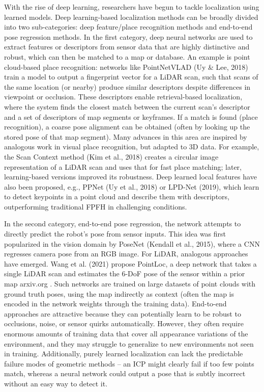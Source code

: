 With the rise of deep learning, researchers have begun to tackle localization using learned models. Deep learning-based localization methods can be broadly divided into two sub-categories: deep feature/place recognition methods and end-to-end pose regression methods. In the first category, deep neural networks are used to extract features or descriptors from sensor data that are highly distinctive and robust, which can then be matched to a map or database. An example is point cloud-based place recognition: networks like PointNetVLAD (Uy & Lee, 2018) train a model to output a fingerprint vector for a LiDAR scan, such that scans of the same location (or nearby) produce similar descriptors despite differences in viewpoint or occlusion. These descriptors enable retrieval-based localization, where the system finds the closest match between the current scan’s descriptor and a set of descriptors of map segments or keyframes. If a match is found (place recognition), a coarse pose alignment can be obtained (often by looking up the stored pose of that map segment). Many advances in this area are inspired by analogous work in visual place recognition, but adapted to 3D data. For example, the Scan Context method (Kim et al., 2018) creates a circular image representation of a LiDAR scan and uses that for fast place matching; later, learning-based versions improved its robustness. Deep learned local features have also been proposed, e.g., PPNet (Uy et al., 2018) or LPD-Net (2019), which learn to detect keypoints in a point cloud and describe them with descriptors, outperforming traditional FPFH in challenging conditions.

In the second category, end-to-end pose regression, the network attempts to directly predict the robot’s pose from sensor inputs. This idea was first popularized in the vision domain by PoseNet (Kendall et al., 2015), where a CNN regresses camera pose from an RGB image. For LiDAR, analogous approaches have emerged. Wang et al. (2021) propose PointLoc, a deep network that takes a single LiDAR scan and estimates the 6-DoF pose of the sensor within a prior map​
arxiv.org
. Such networks are trained on large datasets of point clouds with ground truth poses, using the map indirectly as context (often the map is encoded in the network weights through the training data). End-to-end approaches are attractive because they can potentially learn to be robust to occlusions, noise, or sensor quirks automatically. However, they often require enormous amounts of training data that cover all appearance variations of the environment, and they may struggle to generalize to new environments not seen in training. Additionally, purely learned localization can lack the predictable failure modes of geometric methods – an ICP might clearly fail if too few points match, whereas a neural network could output a pose that is subtly incorrect without an easy way to detect it.

